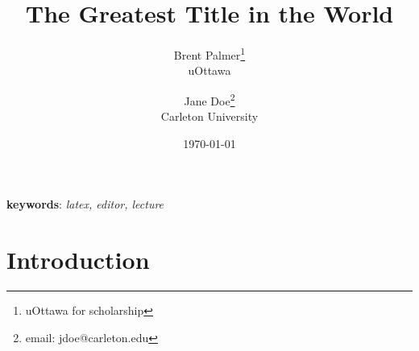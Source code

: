 \documentclass[12pt, twoside]{article}
\title{The Greatest Title in the World}
\author{Brent Palmer\thanks{uOttawa for scholarship}\\uOttawa \and Jane Doe\thanks{email: jdoe@carleton.edu}\\Carleton University}
\date{\today}
\begin{document}
\maketitle

\begin{abstract}
	\lipsum[7]
\end{abstract}

\textbf{keywords}: \emph{latex, editor, lecture}

\section{Introduction}

\lipsum[1-20]
\end{document}
